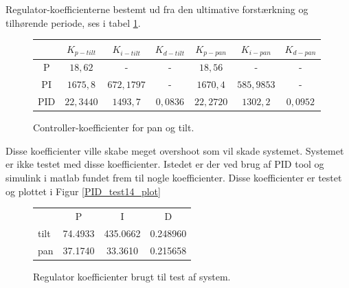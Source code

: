 Regulator-koefficienterne bestemt ud fra den ultimative forstærkning og tilhørende periode, ses i tabel \ref{tb:ZieglerNichols1}.

\begin{figure}[th!]
\centering
\begin{tabular}{c|c|c|c|c|c|c}
&\(K_{p-tilt}\) & \(K_{i-tilt}\) & \(K_{d-tilt}\)&\(K_{p-pan}\) & \(K_{i-pan}\) & \(K_{d-pan}\)\\\hline
P&\(18,62\) &-&-&\(18,56\)&-&-\\
PI&\(1675,8\) & \( 672,1797\) &-&\(1670,4\) & \( 585,9853  \) &-\\
PID&\(22,3440 \) &  \( 1493,7 \) & \(0,0836  \)&\(22,2720 \) &  \( 1302,2 \) & \(0,0952  \)
\end{tabular}
\captionsetup{type=table}
\caption[Controller-koefficienter, Ziegler-Nichols Tuning Methode]{Controller-koefficienter for pan og tilt.}\label{tb:ZieglerNichols1}
\end{figure}

Disse koefficienter ville skabe meget overshoot som vil skade systemet. Systemet er ikke testet med disse koefficienter. 
Istedet er der ved brug af PID tool og simulink i matlab fundet frem til nogle koefficienter.
Disse koefficienter er testet og plottet i Figur \ref{PID_test14_plot} 
\begin{figure}
\centering
  \begin{tabular}{lccc}
      & P & I & D\\
tilt  & 74.4933 & 435.0662 & 0.248960\\
pan   & 37.1740 &  33.3610 & 0.215658
  \end{tabular}
\captionsetup{type=table}
\caption[Regulator koefficienter brugt i test]{Regulator koefficienter brugt til test af system.}
\label{PID_test14} 
\end{figure}

